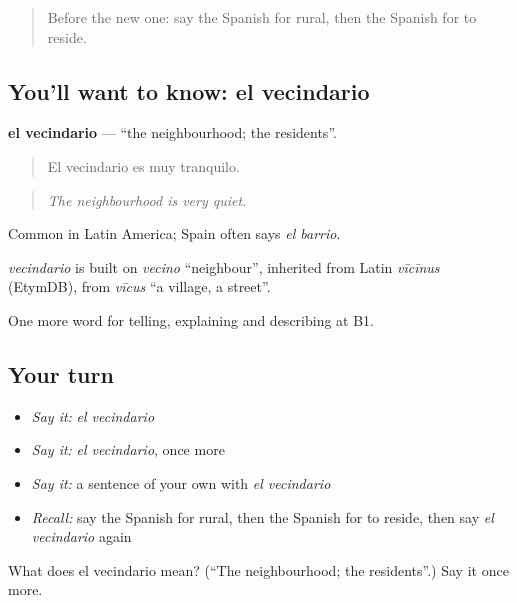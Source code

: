 \label{lesson:ES-C684-vecindario}



\begin{quote}
Before the new one: say the Spanish for rural, then the Spanish for to reside.
\end{quote}

\subsection*{You'll want to know: el vecindario}
\textbf{el vecindario} — \textquotedblleft{}the neighbourhood; the residents\textquotedblright{}.

\begin{quote}
El vecindario es muy tranquilo.
\end{quote}

\begin{quote}
\emph{The neighbourhood is very quiet.}
\end{quote}

Common in Latin America; Spain often says \emph{el barrio}.

\begin{cousinweb}
\emph{vecindario} is built on \emph{vecino} \textquotedblleft{}neighbour\textquotedblright{}, inherited from Latin \emph{vīcīnus} (EtymDB), from \emph{vīcus} \textquotedblleft{}a village, a street\textquotedblright{}.
\end{cousinweb}

\begin{grammarlens}[title={What you've built}]
One more word for telling, explaining and describing at B1.
\end{grammarlens}

\subsection*{Your turn}
\begin{itemize}
\raggedright
  \item \emph{Say it:} \emph{el vecindario}
  \item \emph{Say it:} \emph{el vecindario}, once more
  \item \emph{Say it:} a sentence of your own with \emph{el vecindario}
  \item \emph{Recall:} say the Spanish for rural, then the Spanish for to reside, then say \emph{el vecindario} again
\end{itemize}

\begin{tcolorbox}[breakable,colback=teal!4,colframe=teal!35!black,title={Before you move on}]
What does el vecindario mean? (\textquotedblleft{}The neighbourhood; the residents\textquotedblright{}.) Say it once more.
\end{tcolorbox}
